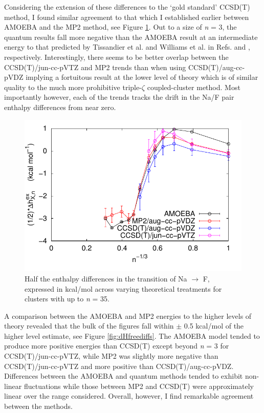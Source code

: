\begin{cpa}
  Considering the extension of these differences to the `gold standard' CCSD(T) method, I found similar agreement to that which I established earlier between AMOEBA
  and the MP2 method, see Figure \ref{fig:dHfreeall}. Out to a size of \emph{n} = 3, the quantum results fall more negative than the AMOEBA result at an intermediate
  energy to that predicted by Tissandier et al. and Williams et al. in Refs. \cite{coe1998cpa1} and \cite{donald2010expand_cpa}, respectively. Interestingly, there
  seems to be better overlap between the CCSD(T)/jun-cc-pVTZ and MP2 trends than when using CCSD(T)/aug-cc-pVDZ implying a fortuitous result at the lower level of 
  theory which is of similar quality to the much more prohibitive triple-$\zeta$ coupled-cluster method. Most importantly however, each of the trends tracks the drift
  in the Na\sur{+}/F\sur{-} pair enthalpy differences from near zero.

\begin{figure}
 \begin{center}
  \includegraphics[width=0.98\linewidth]{images/cpa/deltaH_all-eps-converted-to.pdf}
 \end{center}
\caption[Half the enthalpy differences in the Na\sur{+}$\rightarrow$F\sur{-} transition at several levels of theory]{Half the enthalpy differences in the transition of 
Na $\rightarrow$ F, expressed in kcal/mol across varying theoretical treatments for clusters with up to \emph{n} = 35.}
\label{fig:dHfreeall}
\end{figure}

  A comparison between the AMOEBA and MP2 energies to the higher levels of theory revealed that the bulk of the figures fall within $\pm$ 0.5 kcal/mol of the higher 
  level estimate, see Figure \ref{fig:dHfreediffs}. The AMOEBA model tended to produce more positive energies than CCSD(T) except beyond \emph{n} = 3 for CCSD(T)/jun-cc-pVTZ, 
  while MP2 was slightly more negative than CCSD(T)/jun-cc-pVTZ and more positive than CCSD(T)/aug-cc-pVDZ. Differences between the AMOEBA and quantum methods tended to
  exhibit non-linear fluctuations while those between MP2 and CCSD(T) were approximately linear over the range considered. Overall, however, I find remarkable agreement
  between the methods.


\end{cpa}
